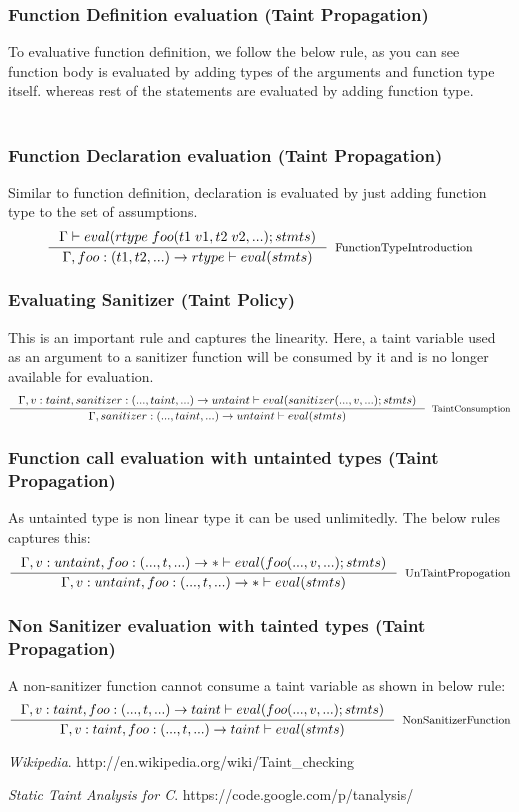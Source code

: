 \documentclass[11pt, pdftex]{article}
\begin{document}
\subsubsection{Function Definition evaluation (Taint Propagation)}
To evaluative function definition, we follow the below rule, as you can see function body is evaluated by adding types of the arguments and function type itself. whereas rest of the statements are evaluated by adding function type.\\
\\
\subsubsection{Function Declaration evaluation (Taint Propagation)}
Similar to function definition, declaration is evaluated by just adding function type to the set of assumptions.
$$ \inference {\Gamma \vdash eval(rtype \; foo(t1\;v1,t2\;v2,...);stmts)}{\Gamma , foo:(t1,t2,...) \to rtype \vdash eval(stmts)}[FunctionTypeIntroduction]$$
\subsubsection{Evaluating Sanitizer (Taint Policy)}
This is an important rule and captures the linearity. Here, a taint variable used as an argument to a sanitizer function will be consumed by it and is no longer available for evaluation.
$$ \inference {\Gamma , v:taint , sanitizer:(...,taint,...) \to untaint \vdash eval(sanitizer(...,v,...);stmts)}{\Gamma , sanitizer:(...,taint,...) \to untaint \vdash eval(stmts)}[TaintConsumption]$$
\subsubsection{Function call evaluation with untainted types (Taint Propagation) }
As untainted type is non linear type it can be used unlimitedly. The below rules captures this:
$$ \inference {\Gamma , v:untaint , foo:(...,t,...) \to * \vdash eval(foo(...,v,...);stmts)}{\Gamma ,  v:untaint , foo:(...,t,...) \to * \vdash eval(stmts)}[UnTaintPropogation]$$
\subsubsection{Non Sanitizer evaluation with tainted types (Taint Propagation)}
A non-sanitizer function cannot consume a taint variable as shown in below rule:
$$ \inference {\Gamma , v:taint , foo:(...,t,...) \to taint \vdash eval(foo(...,v,...);stmts)}{\Gamma ,  v:taint , foo:(...,t,...) \to taint \vdash eval(stmts)}[NonSanitizerFunction]$$

\begin{thebibliography}{2}

\emph{Wikipedia}.
http://en.wikipedia.org/wiki/Taint\_checking

\emph{Static Taint Analysis for C}.
https://code.google.com/p/tanalysis/
\end{thebibliography}
\end{document}
